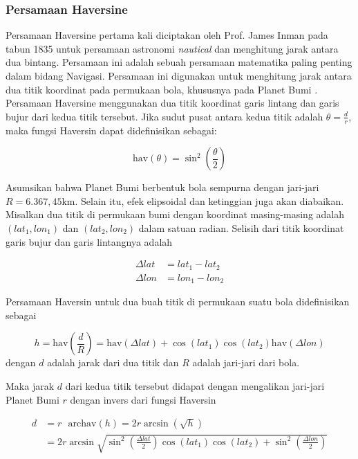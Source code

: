 \subsubsection{Persamaan Haversine}
Persamaan Haversine pertama kali diciptakan oleh Prof. James Inman pada tabun 1835 untuk persamaan astronomi \textit{nautical} dan menghitung jarak antara dua bintang. Persamaan ini adalah sebuah persamaan matematika paling penting dalam bidang Navigasi. Persamaan ini digunakan untuk menghitung jarak antara dua titik koordinat pada permukaan bola, khususnya pada Planet Bumi \cite{Hofmann-Wellenhof2008}\cite{Feng2013}. Persamaan Haversine menggunakan dua titik koordinat garis lintang dan garis bujur dari kedua titik tersebut. Jika sudut pusat antara kedua titik adalah $\theta = \frac{d}{r}$, maka fungsi Haversin dapat didefinisikan sebagai:

$$\text{hav}(\theta) = \sin^2{\left(\frac{\theta}{2}\right)}$$

Asumsikan bahwa Planet Bumi berbentuk bola sempurna dengan jari-jari $R=6.367,45$km. Selain itu, efek elipsoidal dan ketinggian juga akan diabaikan. Misalkan dua titik di permukaan bumi dengan koordinat masing-masing adalah $(lat_1, lon_1)$ dan $(lat_2, lon_2)$ dalam satuan radian. Selisih dari titik koordinat garis bujur dan garis lintangnya adalah

$$
\begin{aligned}
	\Delta lat &= lat_1 - lat_2 \\
	\Delta lon &= lon_1 - lon_2
\end{aligned}
$$

Persamaan Haversin untuk dua buah titik di permukaan suatu bola didefinisikan sebagai

$$
h = \mathrm{hav}\left(\frac{d}{R}\right) = \mathrm{hav}\left(\Delta lat\right) + \cos{\left(lat_1\right)} \cos{\left(lat_2\right)} \mathrm{hav}\left(\Delta lon\right)
$$
dengan $d$ adalah jarak dari dua titik dan $R$ adalah jari-jari dari bola.

Maka jarak $d$ dari kedua titik tersebut didapat dengan mengalikan jari-jari Planet Bumi $r$ dengan invers dari fungsi Haversin \cite{Omatu2013}

$$
\begin{aligned}
	d &= r \text{ }\mathrm{archav}(h) = 2r \arcsin{\left(\sqrt{h}\right)} \\
	&= 2r \arcsin{\sqrt{\sin^2{\left(\frac{\Delta lat}{2}\right)}  \cos{(lat_1)}\cos{(lat_2)} +\sin^2{\left(\frac{\Delta lon}{2}\right)}}}
\end{aligned} 
$$

